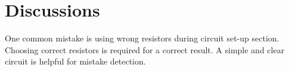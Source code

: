\documentclass[12pt,fleqn]{article}
\begin{document}
\section{Discussions}
One common mistake is using wrong resistors during circuit set-up section. Choosing correct resistors is required for a correct result. A simple and clear circuit is helpful for mistake detection.


\end{document}
